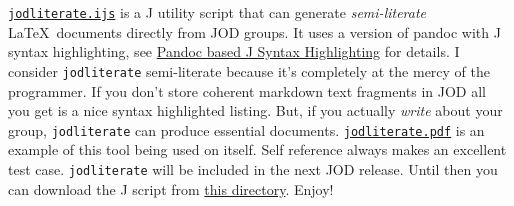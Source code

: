 \href{https://github.com/bakerjd99/jacks/blob/master/jodliterate/jodliterate.ijs}{\texttt{jodliterate.ijs}}
is a J utility script that can generate \emph{semi-literate} \LaTeX\
documents directly from JOD groups. It uses a version of pandoc with J
syntax highlighting, see
\href{http://bakerjd99.wordpress.com/2012/09/20/pandoc-based-j-syntax-highlighting/}{Pandoc
based J Syntax Highlighting} for details. I consider
\texttt{jodliterate} semi-literate because it's completely at the mercy
of the programmer. If you don't store coherent markdown text fragments
in JOD all you get is a nice syntax highlighted listing. But, if you
actually \emph{write} about your group, \texttt{jodliterate} can produce
essential documents.
\href{https://github.com/bakerjd99/jacks/blob/master/jodliterate/jodliterate.pdf}{\texttt{jodliterate.pdf}}
is an example of this tool being used on itself. Self reference always
makes an excellent test case. \texttt{jodliterate} will be included in
the next JOD release. Until then you can download the J script from
\href{https://github.com/bakerjd99/jacks/tree/master/jodliterate}{this directory}. Enjoy!




%